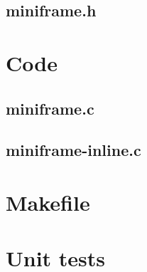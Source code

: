 \subsection{miniframe.h}

\begin{scriptsize}
\begin{ttfamily}

\end{ttfamily}
\end{scriptsize}

\section{Code}

\subsection{miniframe.c}

\begin{scriptsize}
\begin{ttfamily}

\end{ttfamily}
\end{scriptsize}

\subsection{miniframe-inline.c}

\begin{scriptsize}
\begin{ttfamily}

\end{ttfamily}
\end{scriptsize}

\section{Makefile}

\begin{scriptsize}
\begin{ttfamily}

\end{ttfamily}
\end{scriptsize}

\section{Unit tests}

